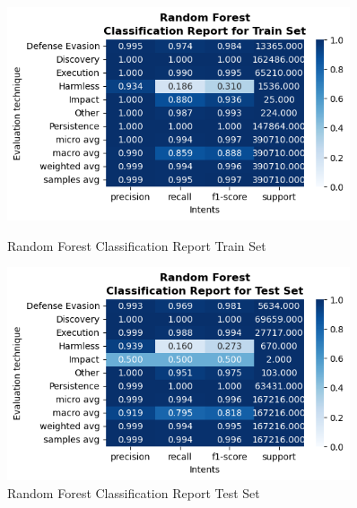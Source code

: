\begin{figure}[H]
            \vspace{0.5cm}  %

            \begin{minipage}{\textwidth}
                \begin{minipage}[t]{0.48\textwidth}
                    \centering
                    \includegraphics[width=0.9\textwidth]{../figures/plots/section2/Random Forest_classification_report_for_Train_set.png}
                    \caption{Random Forest Classification Report Train Set}
                    \label{fig:rf_cm_train}
                \end{minipage}%
                \hfill%
                \begin{minipage}[t]{0.48\textwidth}
                    \centering
                    \includegraphics[width=0.9\textwidth]{../figures/plots/section2/Random Forest_classification_report_for_Test_set.png}
                    \caption{Random Forest Classification Report Test Set}
                    \label{fig:rf_cm_test}
                \end{minipage}  
            
            \end{minipage}
            
        \end{figure}
            
